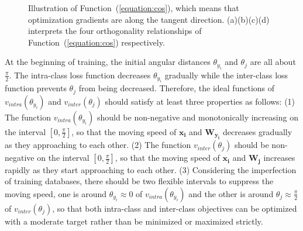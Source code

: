 \documentclass[journal,comsoc]{IEEEtran}
\begin{document}
\begin{figure}[htbp]
	\centering
	
	\caption{Illustration of Function~(\ref{equation:cos}), which means that optimization gradients are along the tangent direction. (a)(b)(c)(d) interprets the four orthogonality relationships of Function~(\ref{equation:cos}) respectively.}
	\label{fig:cos}
\end{figure}

At the beginning of training, the initial angular distances ${\theta _{{y_i}}}$ and ${\theta _j}$ are all about $\frac{\pi }{2}$. The intra-class loss function decreases ${\theta _{{y_i}}}$ gradually while the inter-class loss function prevents ${\theta _j}$ from being decreased. Therefore, the ideal functions of ${v_{intra}}\left( {{\theta _{{y_i}}}} \right)$ and ${v_{inter}}\left( {{\theta _j}} \right)$ should satisfy at least three properties as follows: (1) The function ${v_{intra}}\left( {{\theta _{{y_i}}}} \right)$ should be non-negative and monotonically increasing on the interval $[0,\frac{\pi }{2}]$, so that the moving speed of $\bm{{x_i}}$ and ${\bm{W_{{y_i}}}}$ decreases gradually as they approaching to each other. (2) The function ${v_{inter}}\left( {{\theta _{j}}} \right)$ should be non-negative on the interval $[0,\frac{\pi }{2}]$, so that the moving speed of $\bm{{x_i}}$ and ${\bm{W_{{j}}}}$ increases rapidly as they start approaching to each other. (3) Considering the imperfection of training databases, there should be two flexible intervals to suppress the moving speed, one is around ${\theta _{{y_i}}}\approx0$ of ${v_{intra}}\left( {{\theta _{{y_i}}}} \right)$ and the other is around ${\theta_{j}}\approx\frac{\pi }{2}$ of ${v_{inter}}\left( {{\theta _{j}}} \right)$, so that both intra-class and inter-class objectives can be optimized with a moderate target rather than be minimized or maximized strictly.
\end{document}
